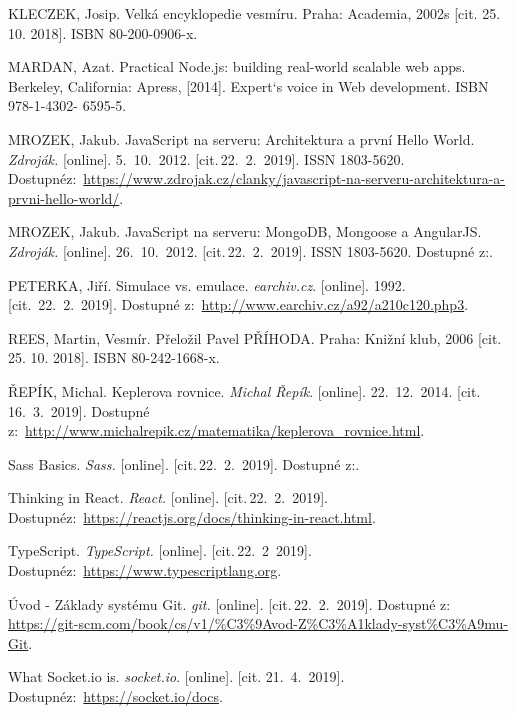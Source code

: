 \documentclass[a4paper,12pt]{article}
\begin{document}
\begin{thebibliography}{99}
KLECZEK, Josip. Velká encyklopedie vesmíru. Praha: Academia, 2002s [cit. 25. 10. 2018]. ISBN 80-200-0906-x.

MARDAN, Azat. Practical Node.js: building real-world scalable web apps. Berkeley, California: Apress, [2014]. Expert‘s voice in Web development. ISBN 978-1-4302- 6595-5.

MROZEK, Jakub. JavaScript na serveru: Architektura a první Hello World.
\textit{Zdroják.} [online]. 5.~10.~2012. [cit.\,22.~2.~2019].  ISSN 1803-5620.
Dostupné\newline z:~{\ttfamily \url{https://www.zdrojak.cz/clanky/javascript-na-serveru-architektura-a-prvni-hello-world/}}.

MROZEK, Jakub. JavaScript na serveru: MongoDB, Mongoose a AngularJS.
\textit{Zdroják.} [online]. 26.~10.~2012. [cit.\,22.~2.~2019]. ISSN 1803-5620.
Dostupné z:.

PETERKA, Jiří. Simulace vs. emulace. \textit{earchiv.cz}. [online]. 1992. [cit.~22.~2.~2019]. Dostupné z:~{\ttfamily\url{http://www.earchiv.cz/a92/a210c120.php3}}.

REES, Martin, Vesmír. Přeložil Pavel PŘÍHODA. Praha: Knižní klub, 2006 [cit. 25. 10. 2018]. ISBN 80-242-1668-x.

ŘEPÍK, Michal. Keplerova rovnice. \textit{Michal Řepík}. [online]. 22.~12.~2014. [cit. 16.~3.~2019]. Dostupné z:~{\ttfamily\url{http://www.michalrepik.cz/matematika/keplerova_rovnice.html}}.

Sass Basics.
\textit{Sass.} [online]. [cit.\,22.~2.~2019].
Dostupné z:.

Thinking in React.
\textit{React.} [online]. [cit.\,22.~2.~2019]. 
Dostupné\newline z:~{\ttfamily \url{https://reactjs.org/docs/thinking-in-react.html}}.

TypeScript. 
\textit{TypeScript.} [online]. [cit.\,22.~2~2019]. 
Dostupné\newline z:~{\ttfamily \url{https://www.typescriptlang.org}}.

Úvod - Základy systému Git.
\textit{git.} [online]. [cit.\,22.~2.~2019]. 
Dostupné z: {\ttfamily \url{https://git-scm.com/book/cs/v1/%C3%9Avod-Z%C3%A1klady-syst%C3%A9mu-Git}}.

What Socket.io is. \textit{socket.io}. [online]. [cit. 21.~4.~2019]. Dostupné\newline z:~{\ttfamily \url{https://socket.io/docs}}.

\end{thebibliography}
\end{document}
